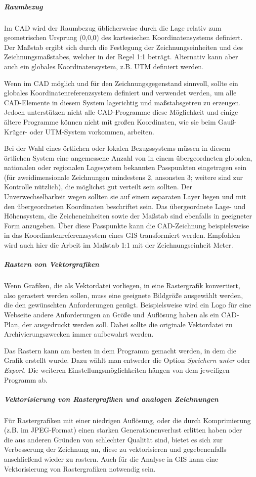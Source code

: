 \label{vektor_raumbezug}
\subparagraph{Raumbezug}
Im CAD wird der Raumbezug üblicherweise durch die Lage relativ zum geometrischen Ursprung (0,0,0) des kartesischen Koordinatensystems definiert. Der Maßstab ergibt sich durch die Festlegung der Zeichnungseinheiten und des Zeichnungsmaßstabes, welcher in der Regel 1:1 beträgt. Alternativ kann aber auch ein globales Koordinatensystem, z.B. UTM definiert werden.

Wenn im CAD möglich und für den Zeichnungsgegenstand sinnvoll, sollte ein globales Koordinatenreferenzsystem definiert und verwendet werden, um alle CAD-Elemente in diesem System lagerichtig und maßstabsgetreu zu erzeugen. Jedoch unterstützen nicht alle CAD-Programme diese Möglichkeit und einige ältere Programme können nicht mit großen Koordinaten, wie sie beim Gauß-Krüger- oder UTM-System vorkommen, arbeiten.

Bei der Wahl eines örtlichen oder lokalen Bezugssystems müssen in diesem örtlichen System eine angemessene Anzahl von in einem übergeordneten globalen, nationalen oder regionalen Lagesystem bekannten Passpunkten eingetragen sein (für zweidimensionale Zeichnungen mindestens 2, ansonsten 3; weitere sind zur Kontrolle nützlich), die möglichst gut verteilt sein sollten. Der Unverwechselbarkeit wegen sollten sie auf einem separaten Layer liegen und mit den übergeordneten Koordinaten beschriftet sein. Das übergeordnete Lage- und Höhensystem, die Zeicheneinheiten sowie der Maßstab sind ebenfalls in geeigneter Form anzugeben. Über diese Passpunkte kann die CAD-Zeichnung beispielsweise in das Koordinatenreferenzsystem eines GIS transformiert werden. Empfohlen wird auch hier die Arbeit im Maßstab 1:1 mit der Zeichnungseinheit Meter.

\subparagraph{Rastern von Vektorgrafiken}
Wenn Grafiken, die als Vektordatei vorliegen, in eine Rastergrafik konvertiert, also gerastert werden sollen, muss eine geeignete Bildgröße ausgewählt werden, die den gewünschten Anforderungen genügt. Beispielsweise wird ein Logo für eine Webseite andere Anforderungen an Größe und Auflösung haben als ein CAD-Plan, der ausgedruckt werden soll. Dabei sollte die originale Vektordatei zu Archivierungszwecken immer aufbewahrt werden.

Das Rastern kann am besten in dem Programm gemacht werden, in dem die Grafik erstellt wurde. Dazu wählt man entweder die Option \emph{Speichern unter} oder \emph{Export}. Die weiteren Einstellungsmöglichkeiten hängen von dem jeweiligen Programm ab.

\subparagraph{Vektorisierung von Rastergrafiken und analogen Zeichnungen}
Für Rastergrafiken mit einer niedrigen Auflösung, oder die durch Komprimierung (z.B. im JPEG-Format) einen starken Generationenverlust erlitten haben oder die aus anderen Gründen von schlechter Qualität sind, bietet es sich zur Verbesserung der Zeichnung an, diese zu vektorisieren und gegebenenfalls anschließend wieder zu rastern. Auch für die Analyse in GIS kann eine Vektorisierung von Rastergrafiken notwendig sein. 

